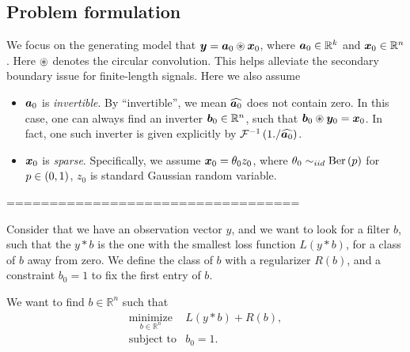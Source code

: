 \subsection{Problem formulation}

We focus on the generating model that $\boldsymbol y = \boldsymbol a_0 \circledast \boldsymbol x_0$, where $\boldsymbol a_0 \in \mathbb R^k$ and $\boldsymbol x_0 \in \mathbb R^n$. Here $\circledast$ denotes the circular convolution. This helps alleviate the secondary boundary issue for finite-length signals. Here we also assume 
\begin{itemize}
\item $\boldsymbol a_0$ is \emph{invertible}. By ``invertible'', we mean $\widehat{\boldsymbol a_0}$ does not contain zero. In this case, one can always find an inverter $\boldsymbol b_0 \in \mathbb R^n$, such that $\boldsymbol b_0 \circledast \boldsymbol y_0 = \boldsymbol x_0$. In fact, one such inverter is given explicitly by $\mathcal F^{-1} \left( 1./\widehat{\boldsymbol a_0} \right)$.  
\item $\boldsymbol x_0$ is \emph{sparse}. Specifically, we assume $\boldsymbol x_0 =\theta_0 z_0$, where $ \theta_0 \sim_{iid} \mathrm{Ber} \left( p \right)$ for $p \in \left( 0, 1 \right)$, $z_0$ is standard Gaussian random variable. 
\end{itemize}




==================================

Consider that we have an observation vector $y$, and we want to look for a filter $b$, such that the $y*b$ is the one with the smallest loss function $L(y*b)$, for a class of $b$ away from zero.  We define the class of $b$ with a regularizer $R(b)$, and a constraint $b_0=1$ to fix the first entry of $b$.

We want to find $b \in \mathbb{R}^n$ such that 
 \begin{eqnarray*}
\underset{b\in \mathbb{R}^n}{\mbox{minimize}}& L(y*b)+R(b) ,\\
\mbox{subject to}& b_0=1.
 \end{eqnarray*}
